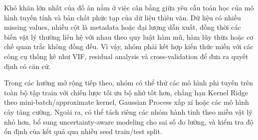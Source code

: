 Khó khăn lớn nhất của đồ án nằm ở việc cân bằng giữa yêu cầu toán học của mô hình tuyến tính và
bản chất phức tạp của dữ liệu thiên văn. Dữ liệu có nhiều missing values, nhiều cột là metadata
hoặc đại lượng dẫn xuất, đồng thời các biến vật lý thường liên hệ với nhau theo quy luật hàm mũ,
hàm lũy thừa hoặc cơ chế quan trắc không đồng đều. Vì vậy, nhóm phải kết hợp kiến thức miền với
các công cụ thống kê như VIF, residual analysis và cross-validation để đưa ra quyết định có căn cứ.

Trong các hướng mở rộng tiếp theo, nhóm có thể thử các mô hình phi tuyến trên toàn bộ tập train
với chiến lược tối ưu bộ nhớ tốt hơn, chẳng hạn Kernel Ridge theo mini-batch/approximate kernel,
Gaussian Process xấp xỉ hoặc các mô hình cây tăng cường. Ngoài ra, có thể tách riêng các nhóm
hành tinh theo miền vật lý nhỏ hơn, bổ sung uncertainty-aware modeling cho sai số đo lường, và
kiểm tra độ ổn định của kết quả qua nhiều seed train/test split.
